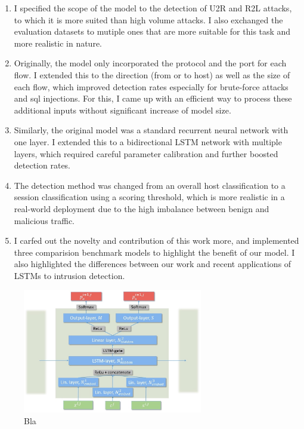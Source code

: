 \documentclass[a4paper,12pt,twoside]{report}
\begin{document}
\begin{enumerate}
\item I specified the scope of the model to the detection of U2R and R2L attacks, to which it is more suited than high volume attacks. I also exchanged the evaluation datasets to mutiple ones that are more suitable for this task and more realistic in nature.
\item Originally, the model only incorporated the protocol and the port for each flow. I extended this to the direction (from or to host) as well as the size of each flow, which improved detection rates especially for brute-force attacks and sql injections. For this, I came up with an efficient way to process these additional inputs without significant increase of model size.
\item Similarly, the original model was a standard recurrent neural network with one layer. I extended this to a bidirectional LSTM network with multiple layers, which required careful parameter calibration and further boosted detection rates.
\item The detection method was changed from an overall host classification to a session classification using a scoring threshold, which is more realistic in a real-world deployment due to the high imbalance between benign and malicious traffic.
\item I carfed out the novelty and contribution of this work more, and implemented three comparision benchmark models to highlight the benefit of our model. I also highlighted the differences between our work and recent applications of LSTMs to intrusion detection.
\end{enumerate}

\begin{figure}
\centering
\includegraphics[width=0.7\textwidth]{images/LSTM_design_new2.jpg}
\caption{Bla}
\label{fig:LSTM}
\end{figure}
\end{document}
